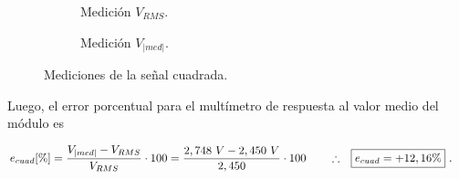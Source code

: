       \begin{figure}[H]
        \centering
        \begin{subfigure}[ht]{0.48\textwidth}
          \caption{Medición $V_{RMS}$.}
          \label{fig:MedicionVrmsCuadrada}
        \end{subfigure}
        \hfill 
        \begin{subfigure}[ht]{0.48\textwidth}
          \caption{Medición $V_{|med|}$.}
          \label{fig:MedicionVmedCuadrada}
        \end{subfigure}
        \caption{Mediciones de la señal cuadrada.}
         \label{fig:MedicionSeñalCuadrada}
      \end{figure}


      Luego, el error porcentual para el multímetro de respuesta al valor medio del módulo es

      \begin{align*}
        e_{cuad} [\%] = \dfrac{V_{|med|} - V_{RMS}}{V_{RMS}} \cdot 100
               = \dfrac{2,748~V - 2,450~V}{2,450} \cdot 100
               \hspace{20pt} \therefore \hspace{10pt} \Aboxed{e_{cuad} = +12,16\%}~.
      \end{align*}


